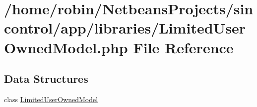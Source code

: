 \hypertarget{_limited_user_owned_model_8php}{}\section{/home/robin/\+Netbeans\+Projects/sincontrol/app/libraries/\+Limited\+User\+Owned\+Model.php File Reference}
\label{_limited_user_owned_model_8php}
\subsection*{Data Structures}
\begin{DoxyCompactItemize}
\item 
class \hyperlink{class_limited_user_owned_model}{Limited\+User\+Owned\+Model}
\end{DoxyCompactItemize}
